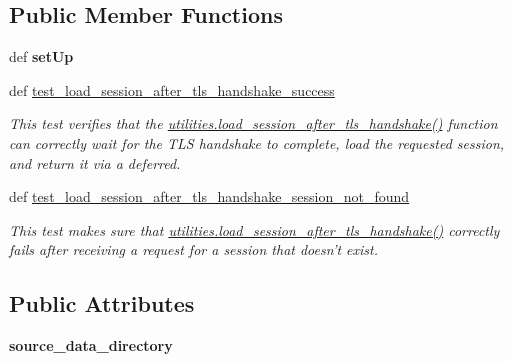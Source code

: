 \subsection*{Public Member Functions}
\begin{DoxyCompactItemize}
\item 
\hypertarget{classhwm_1_1network_1_1protocols_1_1tests_1_1test__protocol__utilities_1_1_test_protocol_utilities_ac49fed66662a6e086f35e1c207518908}{def {\bfseries set\-Up}}\label{classhwm_1_1network_1_1protocols_1_1tests_1_1test__protocol__utilities_1_1_test_protocol_utilities_ac49fed66662a6e086f35e1c207518908}

\item 
def \hyperlink{classhwm_1_1network_1_1protocols_1_1tests_1_1test__protocol__utilities_1_1_test_protocol_utilities_a127df8261277f4f3ed2da1652f8f0c7f}{test\-\_\-load\-\_\-session\-\_\-after\-\_\-tls\-\_\-handshake\-\_\-success}
\begin{DoxyCompactList}\small\item\em This test verifies that the \hyperlink{namespacehwm_1_1network_1_1protocols_1_1utilities_a78d9180aff7807a47984c53273456dd8}{utilities.\-load\-\_\-session\-\_\-after\-\_\-tls\-\_\-handshake()} function can correctly wait for the T\-L\-S handshake to complete, load the requested session, and return it via a deferred. \end{DoxyCompactList}\item 
def \hyperlink{classhwm_1_1network_1_1protocols_1_1tests_1_1test__protocol__utilities_1_1_test_protocol_utilities_a1bd78aeef679c336624241e579761af7}{test\-\_\-load\-\_\-session\-\_\-after\-\_\-tls\-\_\-handshake\-\_\-session\-\_\-not\-\_\-found}
\begin{DoxyCompactList}\small\item\em This test makes sure that \hyperlink{namespacehwm_1_1network_1_1protocols_1_1utilities_a78d9180aff7807a47984c53273456dd8}{utilities.\-load\-\_\-session\-\_\-after\-\_\-tls\-\_\-handshake()} correctly fails after receiving a request for a session that doesn't exist. \end{DoxyCompactList}\end{DoxyCompactItemize}
\subsection*{Public Attributes}
\begin{DoxyCompactItemize}
\item 
\hypertarget{classhwm_1_1network_1_1protocols_1_1tests_1_1test__protocol__utilities_1_1_test_protocol_utilities_ae635db56d702c7bbe793159e9759fd95}{{\bfseries source\-\_\-data\-\_\-directory}}\label{classhwm_1_1network_1_1protocols_1_1tests_1_1test__protocol__utilities_1_1_test_protocol_utilities_ae635db56d702c7bbe793159e9759fd95}

\end{DoxyCompactItemize}



